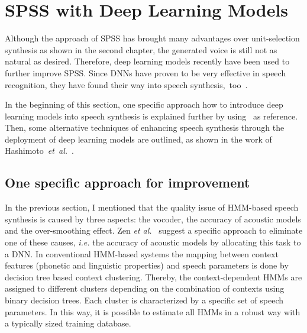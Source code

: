 \section{\ac{SPSS} with Deep Learning Models}
\label{sec:deepspeech}

Although the approach of \ac{SPSS} has brought many advantages over unit-selection synthesis as shown in the second chapter, the generated voice is still not as natural as desired. Therefore, deep learning models recently have been used to further improve \ac{SPSS}. Since \acfp{DNN} have proven to be very effective in speech recognition, they have found their way into speech synthesis,~too~\cite{hashimoto:effect}. %

In the beginning of this section, one specific approach how to introduce deep learning models into speech synthesis is explained further by using~\cite{zen:deepstatistical} as reference. Then, some alternative techniques of enhancing speech synthesis through the deployment of deep learning models are outlined, as shown in the work of Hashimoto~\textit{et~al.}~\cite{hashimoto:effect}.


\subsection{One specific approach for improvement}
\label{subsec:deepspss}

In the previous section, I mentioned that the quality issue of \ac{HMM}-based speech synthesis is caused by three aspects: the vocoder, the accuracy of acoustic models and the over-smoothing effect. Zen \textit{et al.}~\cite{zen:deepstatistical} suggest a specific approach to eliminate one of these causes, \textit{i.e.} the accuracy of acoustic models by allocating this task to a \ac{DNN}. In conventional \ac{HMM}-based systems the mapping between context features (phonetic and linguistic properties) and speech parameters is done by decision tree based context clustering. Thereby, the context-dependent \acp{HMM} are assigned to different clusters depending on the combination of contexts using binary decision trees. Each cluster is characterized by a specific set of speech parameters. In this way, it is possible to estimate all \acp{HMM} in a robust way with a typically sized training database.

